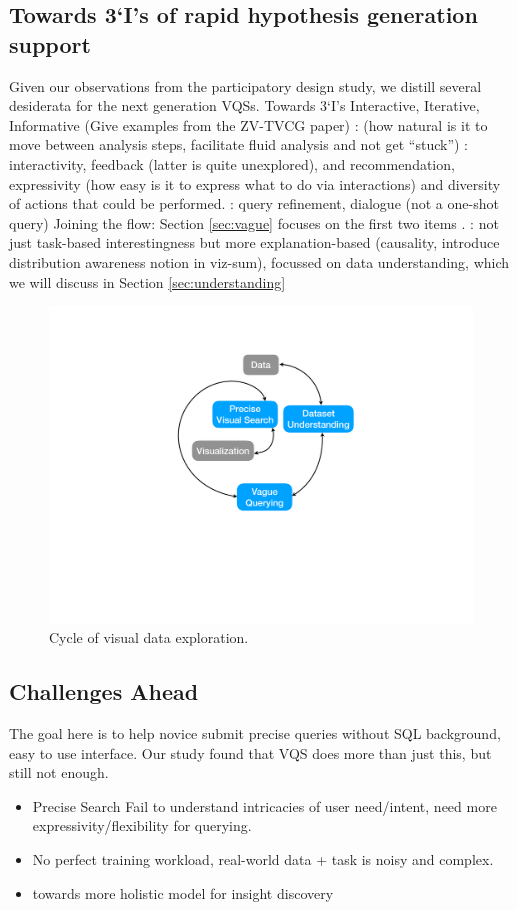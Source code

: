\subsection{Towards 3‘I’s of rapid hypothesis generation support}
Given our observations from the participatory design study, we distill several desiderata for the next generation VQSs. 
Towards 3‘I’s Interactive, Iterative, Informative (Give examples from the ZV-TVCG paper)
:
 (how natural is it to move between analysis steps, facilitate fluid analysis and not get ``stuck'') : interactivity, feedback (latter is quite unexplored), and recommendation, expressivity (how easy is it to express what to do via interactions) and diversity of actions that could be performed.
: query refinement, dialogue (not a one-shot query)
Joining the flow: Section \ref{sec:vague} focuses on the first two items .
: not just task-based interestingness but more explanation-based (causality, introduce distribution awareness notion in viz-sum), focussed on data understanding, which we will discuss in Section \ref{sec:understanding}

\begin{figure}[h!]
	\label{fig:cycle}
	\centering
	\includegraphics[width=0.5\linewidth]{figures/cycle.pdf}
	\caption{Cycle of visual data exploration.}
\end{figure}

\subsection{Challenges Ahead}
The goal here is to help novice submit precise queries without SQL background, easy to use interface. Our study found that VQS does more than just this, but still not enough.
\begin{itemize}
	\item Precise Search Fail to understand intricacies of user need/intent, need more expressivity/flexibility for querying.
	\item  No perfect training workload, real-world data + task is noisy and complex. 
	\item towards more holistic model for insight discovery
\end{itemize}
